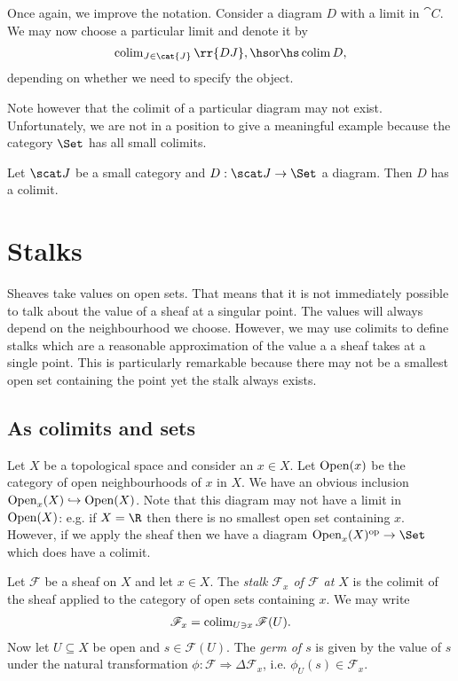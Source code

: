 \documentclass{article}
\begin{document}
\begin{notation}
  Once again, we improve the notation. Consider a diagram
  $D$ with a limit in $\cat{C}$. We may now choose a particular limit and denote
  it by
  \begin{align*}
    \colim_{J\in\cat{J}}\rr{DJ},\hs\text{or}\hs\colim D,
  \end{align*}
  depending on whether we need to specify the object.
\end{notation}

Note however that the colimit of a particular diagram may not exist. Unfortunately, we
are not in a position to give a meaningful example because the category $\Set$ has
all small colimits.

\begin{theorem}
  Let $\scat J$ be a small category and $D:\scat J\to\Set$ a diagram. Then $D$ has a colimit.
\end{theorem}

\section{Stalks}

Sheaves take values on open sets. That means that it is not immediately
possible to talk about the value of a sheaf at a singular point. The
values will always depend on the neighbourhood we choose. However,
we may use colimits to define stalks which are a reasonable approximation
of the value a a sheaf takes at a single point. This is particularly
remarkable because there may not be a smallest open set containing
the point yet the stalk always exists.

\subsection{As colimits and sets}

Let $X$ be a topological space and consider an $x\in X$. Let
$\operatorname{Open}(x)$ be the category of open neighbourhoods of $x$ in $X$.
We have an obvious inclusion $\operatorname{Open}_x(X)\hookrightarrow\operatorname{Open}(X)$.
Note that this diagram may not have a limit in $\operatorname{Open}(X)$:
e.g. if $X=\R$ then there is no smallest open set containing
$x$. However, if we apply the sheaf then we have a diagram
$\Open_x(X)^\text{op}\to\Set$ which does have a colimit.

\begin{definition}
  Let $\mathscr F$ be a sheaf on $X$ and let $x\in X$.
  The \emph{stalk $\mathscr F_x$ of $\mathscr F$ at $X$} is the
  colimit of the sheaf applied to the category of open sets containing $x$.
  We may write
  \begin{align*}
    \mathscr F_x = \operatorname{colim}_{U\ni x} \mathscr F(U).
  \end{align*}
  Now let $U\subseteq X$ be open and $s\in\mathscr F(U)$.
  The \emph{germ of $s$} is given by the value of $s$ under the
  natural transformation $\phi:\mathscr F\Rightarrow\Delta\mathscr F_x$,
  i.e. $\phi_U(s)\in\mathscr F_x$.
\end{definition}
\end{document}
